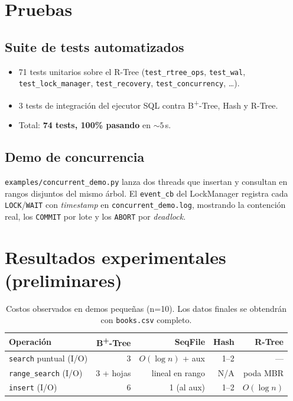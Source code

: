 \documentclass[11pt,a4paper]{article}
\begin{document}
\section{Pruebas}

\subsection{Suite de tests automatizados}
\begin{itemize}[nosep]
    \item 71 tests unitarios sobre el R-Tree
    (\texttt{test\_rtree\_ops}, \texttt{test\_wal},
    \texttt{test\_lock\_manager}, \texttt{test\_recovery},
    \texttt{test\_concurrency}, \dots).
    \item 3 tests de integración del ejecutor SQL contra B\textsuperscript{+}-Tree, Hash y R-Tree.
    \item Total: \textbf{74 tests, 100\% pasando} en $\sim 5\,$s.
\end{itemize}

\subsection{Demo de concurrencia}
\texttt{examples/concurrent\_demo.py} lanza dos threads que insertan y
consultan en rangos disjuntos del mismo árbol. El \texttt{event\_cb} del
LockManager registra cada \texttt{LOCK}/\texttt{WAIT} con \emph{timestamp}
en \texttt{concurrent\_demo.log}, mostrando la contención real, los
\texttt{COMMIT} por lote y los \texttt{ABORT} por \emph{deadlock}.

\section{Resultados experimentales (preliminares)}

\begin{table}[h]
\centering
\small
\begin{tabular}{lrrrr}
\toprule
\textbf{Operación} & \textbf{B\textsuperscript{+}-Tree} & \textbf{SeqFile} & \textbf{Hash} & \textbf{R-Tree} \\
\midrule
\texttt{search} puntual (I/O) & 3 & $O(\log n)$ + aux & 1--2 & --- \\
\texttt{range\_search} (I/O)  & 3 + hojas & lineal en rango & N/A & poda MBR \\
\texttt{insert} (I/O)         & 6 & 1 (al aux) & 1--2 & $O(\log n)$ \\
\bottomrule
\end{tabular}
\caption{Costos observados en demos pequeñas (n=10). Los datos finales se obtendrán con \texttt{books.csv} completo.}
\end{table}
\end{document}
